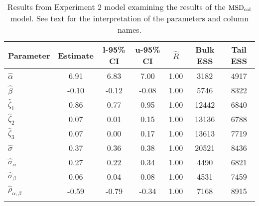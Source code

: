 \begin{table}

\caption{Results from Experiment 2 model examining the results of the $\operatorname{MSD}_{\text{col}}$ model. \label{tab:Experiment 2-MSDobs}See text for the interpretation of the parameters and column names.}

\begin{tabular}{l *3{S[table-format=-1.2]} S[table-format=1.2] *2{S[table-format=5.0]}}
\lsptoprule
Parameter & {Estimate} & {l-95\% CI} & {u-95\% CI} & {$\hat{R}$} & {Bulk ESS} & {Tail ESS}\\
\midrule
$\hat\alpha$ & 6.91 & 6.83 & 7.00 & 1.00 & 3182 & 4917\\
$\hat\beta$ & -0.10 & -0.12 & -0.08 & 1.00 & 5746 & 8322\\
$\hat\zeta_{1}$ & 0.86 & 0.77 & 0.95 & 1.00 & 12442 & 6840\\
$\hat\zeta_{2}$ & 0.07 & 0.01 & 0.15 & 1.00 & 13136 & 6788\\
$\hat\zeta_{3}$ & 0.07 & 0.00 & 0.17 & 1.00 & 13613 & 7719\\
$\hat\sigma$ & 0.37 & 0.36 & 0.38 & 1.00 & 20521 & 8436\\
$\hat\sigma_{\alpha}$ & 0.27 & 0.22 & 0.34 & 1.00 & 4490 & 6821\\
$\hat\sigma_{\beta}$ & 0.06 & 0.04 & 0.08 & 1.00 & 4531 & 7459\\
$\hat\rho_{\alpha,\beta}$ & -0.59 & -0.79 & -0.34 & 1.00 & 7168 & 8915\\
\lspbottomrule
\end{tabular}

\end{table}






